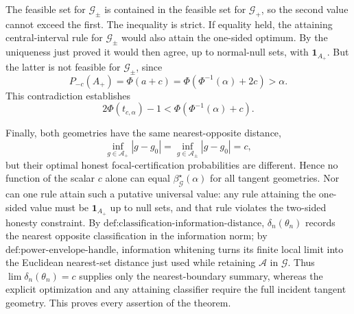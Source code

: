 The feasible set for \(\mathcal G_{\pm}\) is contained in the feasible set for \(\mathcal G_+\), so the second value cannot exceed the first.  The inequality is strict.  If equality held, the attaining central-interval rule for \(\mathcal G_{\pm}\) would also attain the one-sided optimum.  By the uniqueness just proved it would then agree, up to normal-null sets, with \(\mathbf 1_{A_+}\).  But the latter is not feasible for \(\mathcal G_{\pm}\), since
\[
 P_{-c}(A_+)
 =\Phi(a+c)
 =\Phi\!\left(\Phi^{-1}(\alpha)+2c\right)
 >\alpha.
\]
This contradiction establishes
\[
 2\Phi(t_{c,\alpha})-1
 <\Phi\!\left(\Phi^{-1}(\alpha)+c\right).
\]

Finally, both geometries have the same nearest-opposite distance,
\[
 \inf_{g\in\mathcal A_+}|g-g_0|
 =\inf_{g\in\mathcal A_{\pm}}|g-g_0|=c,
\]
but their optimal honest focal-certification probabilities are different.  Hence no function of the scalar \(c\) alone can equal \(\beta^{\star}_{\mathcal G}(\alpha)\) for all tangent geometries.  Nor can one rule attain such a putative universal value: any rule attaining the one-sided value must be \(\mathbf 1_{A_+}\) up to null sets, and that rule violates the two-sided honesty constraint.  By \(\text{def:classification-information-distance}\), \(\delta_n(\theta_n)\) records the nearest opposite classification in the information norm; by \(\text{def:power-envelope-handle}\), information whitening turns its finite local limit into the Euclidean nearest-set distance just used while retaining \(\mathcal A\) in \(\mathcal G\).  Thus \(\lim\delta_n(\theta_n)=c\) supplies only the nearest-boundary summary, whereas the explicit optimization and any attaining classifier require the full incident tangent geometry.  This proves every assertion of the theorem.
